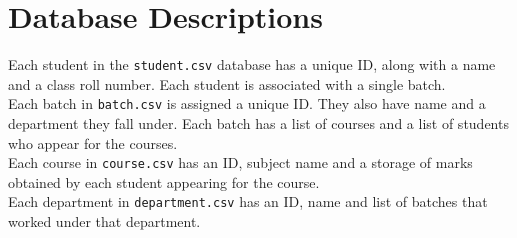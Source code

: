 \documentclass{article}
\begin{document}
\section{Database Descriptions}
	Each student in the \texttt{student.csv} database has a unique ID, along with a name and a class roll number. Each student is associated with a single batch.\\
	Each batch in \texttt{batch.csv} is assigned a unique ID. They also have name and a department they fall under. Each batch has a list of courses and a list of students who appear for the courses.\\
	Each course in \texttt{course.csv} has an ID, subject name and a storage of marks obtained by each student appearing for the course.\\
	Each department in \texttt{department.csv} has an ID, name and list of batches that worked under that department.\\
\end{document}
